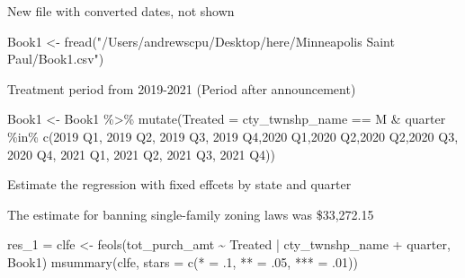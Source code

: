 \documentclass[
]{article}
\newenvironment{Shaded}{\begin{snugshade}}{\end{snugshade}}
\newcommand{\AttributeTok}[1]{\textcolor[rgb]{0.77,0.63,0.00}{#1}}
\newcommand{\DecValTok}[1]{\textcolor[rgb]{0.00,0.00,0.81}{#1}}
\newcommand{\FunctionTok}[1]{\textcolor[rgb]{0.00,0.00,0.00}{#1}}
\newcommand{\NormalTok}[1]{#1}
\newcommand{\OtherTok}[1]{\textcolor[rgb]{0.56,0.35,0.01}{#1}}
\newcommand{\SpecialCharTok}[1]{\textcolor[rgb]{0.00,0.00,0.00}{#1}}
\newcommand{\StringTok}[1]{\textcolor[rgb]{0.31,0.60,0.02}{#1}}
\begin{document}
New file with converted dates, not shown

\begin{Shaded}
\begin{Highlighting}[]
\NormalTok{Book1 }\OtherTok{\textless{}{-}} \FunctionTok{fread}\NormalTok{(}\StringTok{"/Users/andrewscpu/Desktop/here/Minneapolis Saint Paul/Book1.csv"}\NormalTok{)}
\end{Highlighting}
\end{Shaded}

Treatment period from 2019-2021 (Period after announcement)

\begin{Shaded}
\begin{Highlighting}[]
\NormalTok{Book1 }\OtherTok{\textless{}{-}}\NormalTok{ Book1 }\SpecialCharTok{\%\textgreater{}\%}
    \FunctionTok{mutate}\NormalTok{(}\AttributeTok{Treated =}\NormalTok{ cty\_twnshp\_name }\SpecialCharTok{==} \StringTok{\textquotesingle{}M\textquotesingle{}} \SpecialCharTok{\&} 
\NormalTok{           quarter }\SpecialCharTok{\%in\%} \FunctionTok{c}\NormalTok{(}\StringTok{\textquotesingle{}2019 Q1\textquotesingle{}}\NormalTok{, }\StringTok{\textquotesingle{}2019 Q2\textquotesingle{}}\NormalTok{, }\StringTok{\textquotesingle{}2019 Q3\textquotesingle{}}\NormalTok{, }\StringTok{\textquotesingle{}2019 Q4\textquotesingle{}}\NormalTok{,}\StringTok{\textquotesingle{}2020 Q1\textquotesingle{}}\NormalTok{,}\StringTok{\textquotesingle{}2020 Q2\textquotesingle{}}\NormalTok{,}\StringTok{\textquotesingle{}2020 Q2\textquotesingle{}}\NormalTok{,}\StringTok{\textquotesingle{}2020 Q3\textquotesingle{}}\NormalTok{, }\StringTok{\textquotesingle{}2020 Q4\textquotesingle{}}\NormalTok{, }\StringTok{\textquotesingle{}2021 Q1\textquotesingle{}}\NormalTok{, }\StringTok{\textquotesingle{}2021 Q2\textquotesingle{}}\NormalTok{, }\StringTok{\textquotesingle{}2021 Q3\textquotesingle{}}\NormalTok{, }\StringTok{\textquotesingle{}2021 Q4\textquotesingle{}}\NormalTok{))}
\end{Highlighting}
\end{Shaded}

Estimate the regression with fixed effcets by state and quarter

The estimate for banning single-family zoning laws was \$33,272.15

\begin{Shaded}
\begin{Highlighting}[]
\NormalTok{res\_1 }\OtherTok{=}\NormalTok{ clfe }\OtherTok{\textless{}{-}} \FunctionTok{feols}\NormalTok{(tot\_purch\_amt }\SpecialCharTok{\textasciitilde{}}\NormalTok{ Treated }\SpecialCharTok{|}\NormalTok{ cty\_twnshp\_name }\SpecialCharTok{+}\NormalTok{ quarter, Book1)}
\FunctionTok{msummary}\NormalTok{(clfe, }\AttributeTok{stars =} \FunctionTok{c}\NormalTok{(}\StringTok{\textquotesingle{}*\textquotesingle{}} \OtherTok{=}\NormalTok{ .}\DecValTok{1}\NormalTok{, }\StringTok{\textquotesingle{}**\textquotesingle{}} \OtherTok{=}\NormalTok{ .}\DecValTok{05}\NormalTok{, }\StringTok{\textquotesingle{}***\textquotesingle{}} \OtherTok{=}\NormalTok{ .}\DecValTok{01}\NormalTok{))}
\end{Highlighting}
\end{Shaded}
\end{document}
